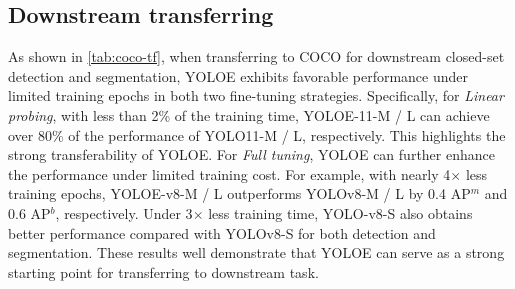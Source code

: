 \documentclass[10pt,twocolumn,letterpaper]{article}
\begin{document}
\subsection{Downstream transferring}
As shown in \cref{tab:coco-tf}, when transferring to COCO for downstream closed-set detection and segmentation, YOLOE exhibits favorable performance under limited training epochs in both two fine-tuning strategies. Specifically, for \textit{Linear probing}, with less than 2\% of the training time, YOLOE-11-M / L can achieve over 80\% of the performance of YOLO11-M / L, respectively. This highlights the strong transferability of YOLOE. For \textit{Full tuning}, YOLOE can further enhance the performance under limited training cost. For example, with nearly 4$\times$ less training epochs, YOLOE-v8-M / L outperforms YOLOv8-M / L by 0.4 AP$^m$ and 0.6 AP$^b$, respectively. Under 3$\times$ less training time, YOLO-v8-S also obtains better performance compared with YOLOv8-S for both detection and segmentation. These results well demonstrate that YOLOE can serve as a strong starting point for transferring to downstream task.
\end{document}
